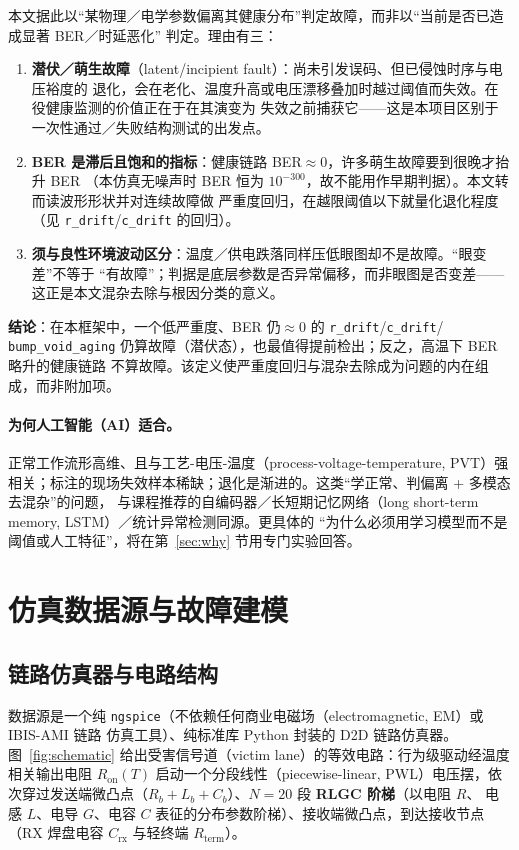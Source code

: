 \documentclass[11pt,a4paper,fontset=mac]{ctexart}
\newcommand{\term}[1]{\textbf{#1}}
\begin{document}
本文据此以“某物理／电学参数偏离其健康分布”判定故障，而非以“当前是否已造成显著 BER／时延恶化”
判定。理由有三：
\begin{enumerate}
\item \textbf{潜伏／萌生故障}（latent/incipient fault）：尚未引发误码、但已侵蚀时序与电压裕度的
退化，会在老化、温度升高或电压漂移叠加时越过阈值而失效。在役健康监测的价值正在于在其演变为
失效之前捕获它——这是本项目区别于一次性通过／失败结构测试的出发点。
\item \textbf{BER 是滞后且饱和的指标}：健康链路 BER$\approx0$，许多萌生故障要到很晚才抬升 BER
（本仿真无噪声时 BER 恒为 $10^{-300}$，故不能用作早期判据）。本文转而读波形形状并对连续故障做
严重度回归，在越限阈值以下就量化退化程度（见 \texttt{r\_drift}/\texttt{c\_drift} 的回归）。
\item \textbf{须与良性环境波动区分}：温度／供电跌落同样压低眼图却不是故障。“眼变差”不等于
“有故障”；判据是底层参数是否异常偏移，而非眼图是否变差——这正是本文混杂去除与根因分类的意义。
\end{enumerate}
\textbf{结论}：在本框架中，一个低严重度、BER 仍$\approx0$ 的 \texttt{r\_drift}/\texttt{c\_drift}/
\texttt{bump\_void\_aging} 仍算故障（潜伏态），也最值得提前检出；反之，高温下 BER 略升的健康链路
不算故障。该定义使严重度回归与混杂去除成为问题的内在组成，而非附加项。

\paragraph{为何人工智能（AI）适合。} 正常工作流形高维、且与工艺-电压-温度（process-voltage-temperature,
PVT）强相关；标注的现场失效样本稀缺；退化是渐进的。这类“学正常、判偏离 + 多模态去混杂”的问题，
与课程推荐的自编码器／长短期记忆网络（long short-term memory, LSTM）／统计异常检测同源。更具体的
“为什么必须用学习模型而不是阈值或人工特征”，将在第~\ref{sec:why} 节用专门实验回答。

\section{仿真数据源与故障建模}

\subsection{链路仿真器与电路结构}
数据源是一个纯 \texttt{ngspice}（不依赖任何商业电磁场（electromagnetic, EM）或 IBIS-AMI 链路
仿真工具）、纯标准库 Python 封装的 D2D 链路仿真器。图~\ref{fig:schematic} 给出受害信号道（victim
lane）的等效电路：行为级驱动经温度相关输出电阻 $R_\text{on}(T)$ 启动一个分段线性（piecewise-linear,
PWL）电压摆，依次穿过发送端微凸点（$R_b{+}L_b{+}C_b$）、$N{=}20$ 段 \term{RLGC 阶梯}（以电阻 $R$、
电感 $L$、电导 $G$、电容 $C$ 表征的分布参数阶梯）、接收端微凸点，到达接收节点（RX 焊盘电容
$C_\text{rx}$ 与轻终端 $R_\text{term}$）。
\end{document}
